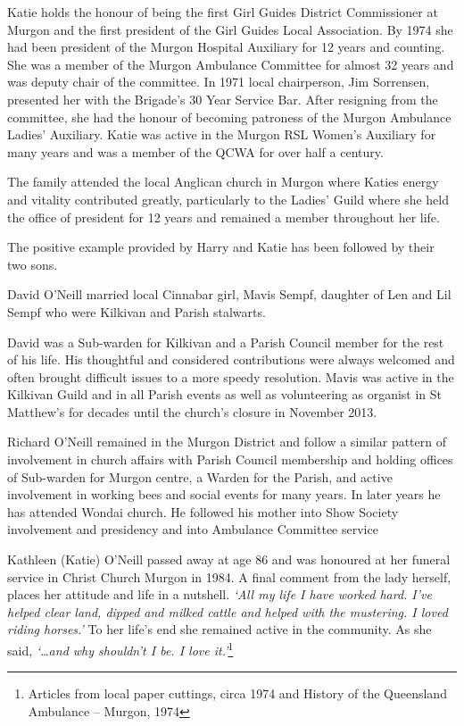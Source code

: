 Katie holds the honour of being the first Girl Guides District Commissioner at Murgon and the first president of the Girl Guides Local Association. By 1974 she had been president of the Murgon Hospital Auxiliary for 12 years and counting. She was a member of the Murgon Ambulance Committee for almost 32 years and was deputy chair of the committee. In 1971 local chairperson, Jim Sorrensen, presented her with the Brigade's 30 Year Service Bar. After resigning from the committee, she had the honour of becoming patroness of the Murgon Ambulance Ladies' Auxiliary. Katie was active in the Murgon RSL Women's Auxiliary for many years and was a member of the QCWA for over half a century.

The family attended the local Anglican church in Murgon where Katies energy and vitality contributed greatly, particularly to the Ladies' Guild where she held the office of president for 12 years and remained a member throughout her life.

The positive example provided by Harry and Katie has been followed by their two sons.

David O'Neill married local Cinnabar girl, Mavis Sempf, daughter of Len and Lil Sempf who were Kilkivan and Parish stalwarts.

David was a Sub-warden for Kilkivan and a Parish Council member for the rest of his life. His thoughtful and considered contributions were always welcomed and often brought difficult issues to a more speedy resolution. Mavis was active in the Kilkivan Guild and in all Parish events as well as volunteering as organist in St Matthew's for decades until the church's closure in November 2013.

Richard O'Neill remained in the Murgon District and follow a similar pattern of involvement in church affairs with Parish Council membership and holding offices of Sub-warden for Murgon centre, a Warden for the Parish, and active involvement in working bees and social events for many years. In later years he has attended Wondai church. He followed his mother into Show Society involvement and presidency and into Ambulance Committee service

Kathleen (Katie) O'Neill passed away at age 86 and was honoured at her funeral service in Christ Church Murgon in 1984. A final comment from the lady herself, places her attitude and life in a nutshell. \emph{`All my life I have worked hard. I've helped clear land, dipped and milked cattle and helped with the mustering. I loved riding horses.'} To her life's end she remained active in the community. As she said, \emph{`\ldots and why shouldn't I be. I love it.'}\footnote{Articles from local paper cuttings, circa 1974 and History of the Queensland Ambulance -- Murgon, 1974}

